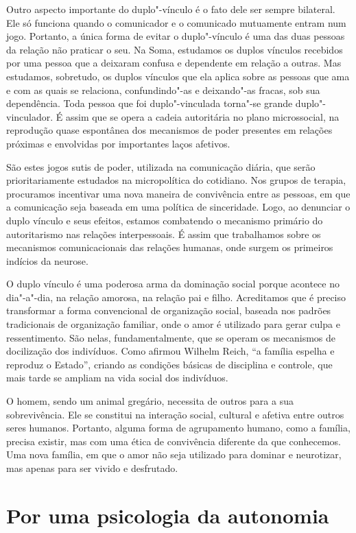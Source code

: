 Outro aspecto importante do duplo"-vínculo é o fato dele ser sempre
bilateral. Ele só funciona quando o comunicador e o comunicado
mutuamente entram num jogo. Portanto, a única forma de evitar o
duplo"-vínculo é uma das duas pessoas da relação não praticar o seu. Na
Soma, estudamos os duplos vínculos recebidos por uma pessoa que a
deixaram confusa e dependente em relação a outras. Mas estudamos,
sobretudo, os duplos vínculos que ela aplica sobre as pessoas que ama e
com as quais se relaciona, confundindo"-as e deixando"-as fracas, sob sua
dependência. Toda pessoa que foi duplo"-vinculada torna"-se grande
duplo"-vinculador. É assim que se opera a cadeia autoritária no plano
microssocial, na reprodução quase espontânea dos mecanismos de poder
presentes em relações próximas e envolvidas por importantes laços
afetivos.

São estes jogos sutis de poder, utilizada na comunicação diária, que
serão prioritariamente estudados na micropolítica do cotidiano. Nos
grupos de terapia, procuramos incentivar uma nova maneira de convivência
entre as pessoas, em que a comunicação seja baseada em uma política de
sinceridade. Logo, ao denunciar o duplo vínculo e seus efeitos, estamos
combatendo o mecanismo primário do autoritarismo nas relações
interpessoais. É assim que trabalhamos sobre os mecanismos
comunicacionais das relações humanas, onde surgem os primeiros indícios
da neurose.

O duplo vínculo é uma poderosa arma da dominação social porque acontece
no dia"-a"-dia, na relação amorosa, na relação pai e filho. Acreditamos
que é preciso transformar a forma convencional de organização social,
baseada nos padrões tradicionais de organização familiar, onde o amor é
utilizado para gerar culpa e ressentimento. São nelas, fundamentalmente,
que se operam os mecanismos de docilização dos indivíduos. Como afirmou
Wilhelm Reich, ``a família espelha e reproduz o Estado'', criando as
condições básicas de disciplina e controle, que mais tarde se ampliam na
vida social dos indivíduos.

O homem, sendo um animal gregário, necessita de outros para a sua
sobrevivência. Ele se constitui na interação social, cultural e afetiva
entre outros seres humanos. Portanto, alguma forma de agrupamento
humano, como a família, precisa existir, mas com uma ética de
convivência diferente da que conhecemos. Uma nova família, em que o amor
não seja utilizado para dominar e neurotizar, mas apenas para ser vivido
e desfrutado.

\section{Por uma psicologia da autonomia}

